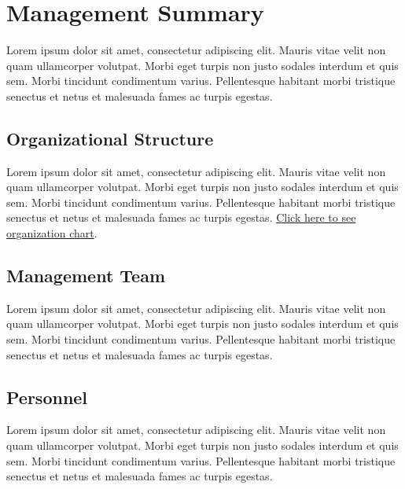 \documentclass[11pt,titlepage]{article}
\begin{document}
\section{Management Summary}
Lorem ipsum dolor sit amet, consectetur adipiscing elit. Mauris vitae velit 
non quam ullamcorper volutpat. Morbi eget turpis non justo sodales interdum 
et quis sem. Morbi tincidunt condimentum varius. Pellentesque habitant morbi 
tristique senectus et netus et malesuada fames ac turpis egestas.\newline

\subsection{Organizational Structure}
Lorem ipsum dolor sit amet, consectetur adipiscing elit. Mauris vitae velit 
non quam ullamcorper volutpat. Morbi eget turpis non justo sodales interdum 
et quis sem. Morbi tincidunt condimentum varius. Pellentesque habitant morbi 
tristique senectus et netus et malesuada fames ac turpis egestas.\newline
\hyperlink{ref_org_chart}{Click here to see organization chart}.

\subsection{Management Team}
Lorem ipsum dolor sit amet, consectetur adipiscing elit. Mauris vitae velit 
non quam ullamcorper volutpat. Morbi eget turpis non justo sodales interdum 
et quis sem. Morbi tincidunt condimentum varius. Pellentesque habitant morbi 
tristique senectus et netus et malesuada fames ac turpis egestas.\newline

\subsection{Personnel}
Lorem ipsum dolor sit amet, consectetur adipiscing elit. Mauris vitae velit 
non quam ullamcorper volutpat. Morbi eget turpis non justo sodales interdum 
et quis sem. Morbi tincidunt condimentum varius. Pellentesque habitant morbi 
tristique senectus et netus et malesuada fames ac turpis egestas.\newline
\end{document}
